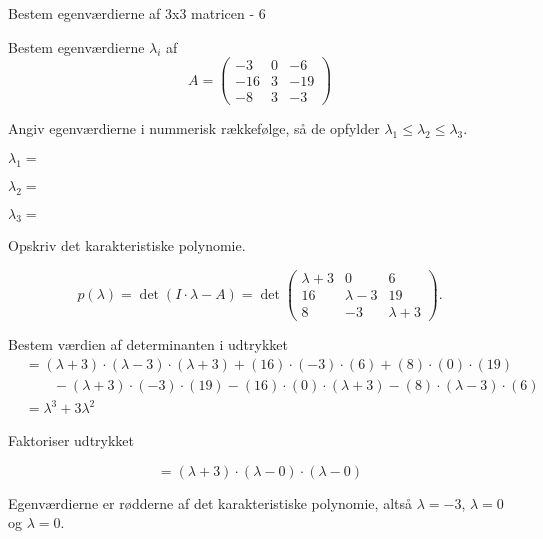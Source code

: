 \documentclass{article}
\begin{document}
\begin{exercise}{Bestem egenværdierne af 3x3 matricen - 6}

Bestem egenværdierne $\lambda_i$ af 
\[
A=\begin{pmatrix}
-3 & 0 & -6 \\
-16 & 3 & -19 \\
-8 & 3 & -3
\end{pmatrix}
\]

Angiv egenværdierne i nummerisk rækkefølge, så de
opfylder $\lambda_1 \le \lambda_2 \le \lambda_3$.

$\lambda_1 = $ 

$\lambda_2 = $ 

$\lambda_3 = $ 

\hint
Opskriv det karakteristiske polynomie.

\hint
\[
p(\lambda)=\det\left(I \cdot \lambda - A \right)=\det\begin{pmatrix}
\lambda + 3 & 0 & 6 \\
16 & \lambda - 3 & 19 \\
8 & -3 & \lambda+3
\end{pmatrix}.
\]

\hint
Bestem værdien af determinanten i udtrykket
\begin{align*}
&=(\lambda+3) \cdot (\lambda-3) \cdot (\lambda+3)+(16) \cdot (-3) \cdot (6)+(8) \cdot (0) \cdot (19) \\
& \qquad -(\lambda+3) \cdot (-3) \cdot (19)-(16) \cdot (0) \cdot (\lambda+3)-(8) \cdot (\lambda-3) \cdot (6) \\
&=\lambda^3+3\lambda^2
\end{align*}

\hint
Faktoriser udtrykket

\hint
\[
=(\lambda+3) \cdot (\lambda-0) \cdot (\lambda-0)
\]

\hint
Egenværdierne er rødderne af det karakteristiske polynomie, 
altså
$\lambda=-3$, $\lambda=0$ og $\lambda=0$.

\end{exercise}
\end{document}
